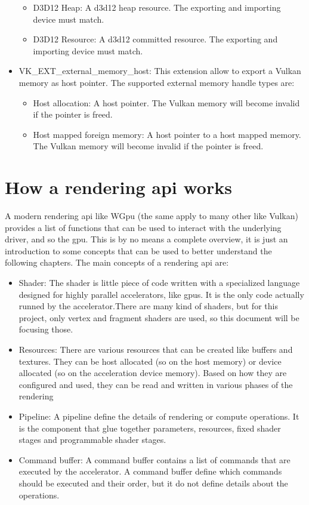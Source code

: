 \begin{itemize}
\begin{itemize}
		\item D3D12 Heap: A d3d12 heap resource.  The exporting and importing device must match.
		\item D3D12 Resource: A d3d12 committed resource.  The exporting and importing device must match.
	\end{itemize}
	\item VK\_EXT\_external\_memory\_host: This extension allow to export a Vulkan memory as host pointer. The supported external memory handle types are:
	\begin{itemize}
		\item Host allocation: A host pointer. The Vulkan memory will become invalid if the pointer is freed.
		\item Host mapped foreign memory: A host pointer to a host mapped memory. The Vulkan memory will become invalid if the pointer is freed.
	\end{itemize}
\end{itemize}



\section{How a rendering api works}
A modern rendering api like WGpu (the same apply to many other like Vulkan) provides a list of functions that can be used to interact with the underlying driver, and so the gpu. This is by no means a complete overview, it is just an introduction to some concepts that can be used to better understand the following chapters. The main concepts of a rendering api are:
\begin{itemize}
	\item Shader: The shader is little piece of code written with a specialized language designed for highly parallel accelerators, like gpus. It is the only code actually runned by the accelerator.There are many kind of shaders, but for this project, only vertex and fragment shaders are used, so this document will be focusing those.
	\item Resources: There are various resources that can be created like buffers and textures. They can be host allocated (so on the host memory) or device allocated (so on the acceleration device memory). Based on how they are configured and used, they can be read and written in various phases of the rendering
	\item Pipeline: A pipeline define the details of rendering or compute operations. It is the component that glue together parameters, resources, fixed shader stages and programmable shader stages.
	\item Command buffer: A command buffer contains a list of commands that are executed by the accelerator. A command buffer define which commands should be executed and their order, but it do not define details about the operations.
\end{itemize}

